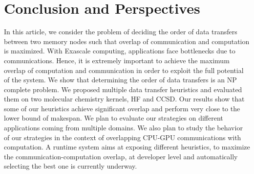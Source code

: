\documentclass[runningheads]{llncs} %
\begin{document}
\section{Conclusion and Perspectives}


In this article, we consider the problem of deciding the order of data transfers between two memory nodes such that overlap of communication and  computation is maximized. With Exascale computing, applications face bottlenecks due to communications. Hence, it is extremely important to achieve the maximum overlap of computation and communication in order to exploit the full potential of the system. We show that determining the order of data transfers is an NP complete problem. We proposed multiple data transfer heuristics and evaluated them on two molecular chemistry kernels, HF and CCSD. Our results show that some of our heuristics achieve significant overlap and perform very close to the lower bound of makespan. We plan to evaluate our strategies on different applications coming from multiple domains. We also plan to study the behavior of our strategies in the context of overlapping CPU-GPU communications with computation. A runtime system aims at exposing different heuristics, to maximize the communication-computation overlap, at developer level and automatically selecting the best one is currently underway.





\end{document}
